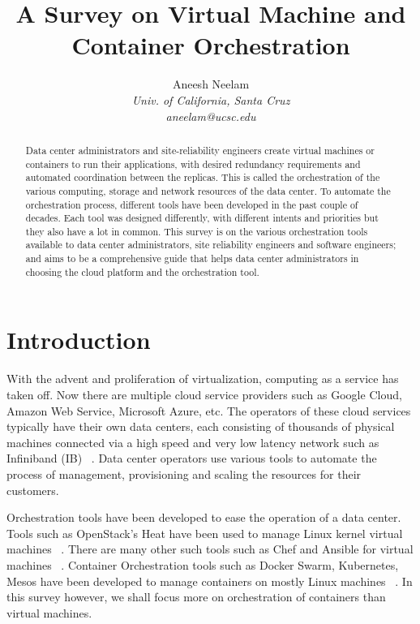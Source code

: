 \documentclass[10pt,twocolumn]{article}
\begin{document}
\title{A Survey on Virtual Machine and Container Orchestration}

\author{
Aneesh Neelam \\
\textit{Univ. of California, Santa Cruz} \\
\textit{aneelam@ucsc.edu}
}

\maketitle
\thispagestyle{empty}

\begin{abstract}

  Data center administrators and site-reliability engineers create virtual machines or containers to run their applications, with desired redundancy requirements and automated coordination between the replicas.
  This is called the orchestration of the various computing, storage and network resources of the data center.
  To automate the orchestration process, different tools have been developed in the past couple of decades.
  Each tool was designed differently, with different intents and priorities but they also have a lot in common.
  This survey is on the various orchestration tools available to data center administrators, site reliability engineers and software engineers;
  and aims to be a comprehensive guide that helps data center administrators in choosing the cloud platform and the orchestration tool.

\end{abstract}

\section{Introduction}

With the advent and proliferation of virtualization, computing as a service has taken off.
Now there are multiple cloud service providers such as Google Cloud, Amazon Web Service, Microsoft Azure, etc.
The operators of these cloud services typically have their own data centers, each consisting of thousands of physical machines connected via a high speed and very low latency network such as Infiniband (IB) ~\cite{intro_infiniband}.
Data center operators use various tools to automate the process of management, provisioning and scaling the resources for their customers.

Orchestration tools have been developed to ease the operation of a data center.
Tools such as OpenStack's Heat have been used to manage Linux kernel virtual machines ~\cite{openstack}.
There are many other such tools such as Chef and Ansible for virtual machines ~\cite{chef, ansible}.
Container Orchestration tools such as Docker Swarm, Kubernetes, Mesos have been developed to manage containers on mostly Linux machines ~\cite{docker_swarm, kubernetes, mesos}.
In this survey however, we shall focus more on orchestration of containers than virtual machines.
\end{document}

